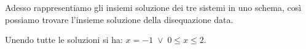 \begin{exrig}
\begin{esempio}
Adesso rappresentiamo gli insiemi soluzione dei tre sistemi in uno schema, così possiamo trovare l'insieme soluzione della disequazione data.

\begin{center}

\end{center}

Unendo tutte le soluzioni si ha: $x=-1\;\vee\; 0\le x\le 2$.
\end{esempio}
\end{exrig}
\ovalbox{\risolvii \ref{ese:7.31}, \ref{ese:7.32}, \ref{ese:7.33}, \ref{ese:7.34}, \ref{ese:7.35}, \ref{ese:7.36}, \ref{ese:7.37}}

\newpage

\cleardoublepage
